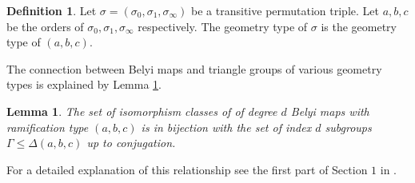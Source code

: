 \documentclass{dcthesis}
\newcommand{\defi}[1]{\textsf{#1}}
\newcommand{\mm}[1]{{\color{blue} \sf MM: [#1]}}
\numberwithin{equation}{section}
\newtheorem{theorem}[equation]{Theorem}
\newtheorem{prop}[equation]{Proposition}
\newtheorem{lemma}[equation]{Lemma}
\theoremstyle{definition}
\newtheorem{definition}[equation]{Definition}
\theoremstyle{remark}
\begin{document}
{{{\begin{definition}
      Let $\sigma=(\sigma_0,\sigma_1,\sigma_\infty)$ be a transitive permutation triple.
      Let $a,b,c$ be the orders of
      $\sigma_0,\sigma_1,\sigma_\infty$ respectively.
      The \defi{geometry type} of $\sigma$
      is the geometry type of $(a,b,c)$.
    \end{definition}
    The connection between Belyi maps
    and triangle groups
    of various geometry types is explained by Lemma
    \ref{lem:belyimapsandtrianglegroups}.
    \begin{lemma}
      \label{lem:belyimapsandtrianglegroups}
      The set of isomorphism classes of of degree $d$
      Belyi maps with ramification type $(a,b,c)$
      is in bijection with the set of
      index $d$ subgroups
      $\Gamma\leq\Delta(a,b,c)$
      up to conjugation.
    \end{lemma}
    For a detailed explanation of this relationship
    see the first part of Section $1$
    in \cite{KMSV}.
  }
}}
\end{document}
